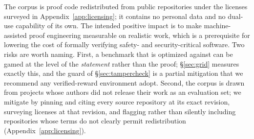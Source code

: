 \documentclass{article}
\begin{document}
The corpus is proof code redistributed from public repositories under
the licenses surveyed in Appendix~\ref{app:licensing}; it contains no
personal data and no dual-use capability of its own. The intended
positive impact is to make machine-assisted proof engineering
measurable on realistic work, which is a prerequisite for lowering the
cost of formally verifying safety- and security-critical software. Two
risks are worth naming. First, a benchmark that is optimized against
can be gamed at the level of the \emph{statement} rather than the
proof; \S\ref{sec:grid} measures exactly this, and the guard of
\S\ref{sec:tampercheck} is a partial mitigation that we recommend any
verified-reward environment adopt. Second, the corpus is drawn from
projects whose authors did not release their work as an evaluation
set; we mitigate by pinning and citing every source repository at its
exact revision, surveying licenses at that revision, and flagging
rather than silently including repositories whose terms do not clearly
permit redistribution (Appendix~\ref{app:licensing}).


\newpage

\end{document}
